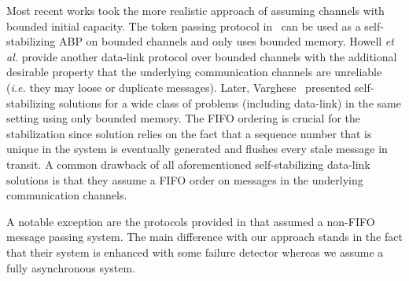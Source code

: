 \documentclass[11pt]{article}
\begin{document}
Most recent works took the more realistic approach of assuming channels with bounded initial capacity. The token passing protocol in~\cite{DIM97j} can be used as a self-stabilizing ABP on bounded channels and only uses bounded memory. Howell \emph{et al.} \cite{HNM99c} provide another data-link protocol over bounded channels with the additional desirable property that the underlying communication channels are unreliable (\emph{i.e.} they may loose or duplicate messages). Later, Varghese~\cite{V00j} presented self-stabilizing solutions for a wide class of problems (including data-link) in the same setting using only bounded memory. The FIFO ordering is crucial for the stabilization since solution relies on the fact that a sequence number that is unique in the system is eventually generated and flushes every stale message in transit. A common drawback of all aforementioned self-stabilizing data-link solutions is that they assume a FIFO order on messages in the underlying communication channels. 

A notable exception are the protocols provided in \cite{BK97j} that assumed a non-FIFO message passing system. The main difference with our approach stands in the fact that their system is enhanced with some failure detector whereas we assume a fully asynchronous system.
\end{document}
